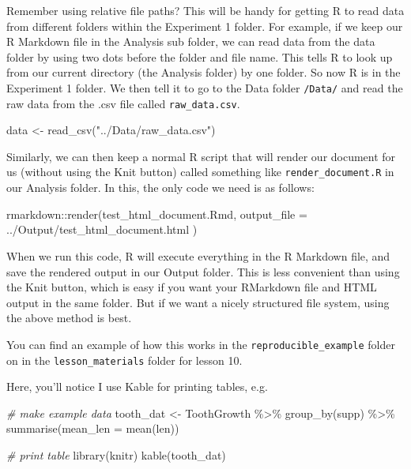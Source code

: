 \documentclass[
]{book}
\newenvironment{Shaded}{\begin{snugshade}}{\end{snugshade}}
\newcommand{\AttributeTok}[1]{\textcolor[rgb]{0.77,0.63,0.00}{#1}}
\newcommand{\CommentTok}[1]{\textcolor[rgb]{0.56,0.35,0.01}{\textit{#1}}}
\newcommand{\FunctionTok}[1]{\textcolor[rgb]{0.00,0.00,0.00}{#1}}
\newcommand{\NormalTok}[1]{#1}
\newcommand{\OtherTok}[1]{\textcolor[rgb]{0.56,0.35,0.01}{#1}}
\newcommand{\SpecialCharTok}[1]{\textcolor[rgb]{0.00,0.00,0.00}{#1}}
\newcommand{\StringTok}[1]{\textcolor[rgb]{0.31,0.60,0.02}{#1}}
\begin{document}
Remember using relative file paths? This will be handy for getting R to read data from different folders within the Experiment 1 folder. For example, if we keep our R Markdown file in the Analysis sub folder, we can read data from the data folder by using two dots before the folder and file name. This tells R to look up from our current directory (the Analysis folder) by one folder. So now R is in the Experiment 1 folder. We then tell it to go to the Data folder \texttt{/Data/} and read the raw data from the .csv file called \texttt{raw\_data.csv}.

\begin{Shaded}
\begin{Highlighting}[]
\NormalTok{data }\OtherTok{\textless{}{-}} \FunctionTok{read\_csv}\NormalTok{(}\StringTok{"../Data/raw\_data.csv"}\NormalTok{)}
\end{Highlighting}
\end{Shaded}

Similarly, we can then keep a normal R script that will render our document for us (without using the Knit button) called something like \texttt{render\_document.R} in our Analysis folder. In this, the only code we need is as follows:

\begin{Shaded}
\begin{Highlighting}[]
\NormalTok{rmarkdown}\SpecialCharTok{::}\FunctionTok{render}\NormalTok{(}\StringTok{\textquotesingle{}test\_html\_document.Rmd\textquotesingle{}}\NormalTok{, }
                  \AttributeTok{output\_file =} \StringTok{\textquotesingle{}../Output/test\_html\_document.html\textquotesingle{}}
\NormalTok{                  )}
\end{Highlighting}
\end{Shaded}

When we run this code, R will execute everything in the R Markdown file, and save the rendered output in our Output folder. This is less convenient than using the Knit button, which is easy if you want your RMarkdown file and HTML output in the same folder. But if we want a nicely structured file system, using the above method is best.

You can find an example of how this works in the \texttt{reproducible\_example} folder on in the \texttt{lesson\_materials} folder for lesson 10.

Here, you'll notice I use Kable for printing tables, e.g.

\begin{Shaded}
\begin{Highlighting}[]
\CommentTok{\# make example data}
\NormalTok{tooth\_dat }\OtherTok{\textless{}{-}}\NormalTok{ ToothGrowth }\SpecialCharTok{\%\textgreater{}\%} \FunctionTok{group\_by}\NormalTok{(supp) }\SpecialCharTok{\%\textgreater{}\%} \FunctionTok{summarise}\NormalTok{(}\AttributeTok{mean\_len =} \FunctionTok{mean}\NormalTok{(len))}

\CommentTok{\# print table}
\FunctionTok{library}\NormalTok{(knitr)}
\FunctionTok{kable}\NormalTok{(tooth\_dat) }
\end{Highlighting}
\end{Shaded}
\end{document}
